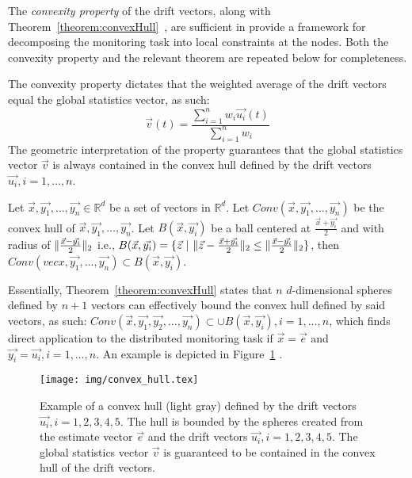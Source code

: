 The \emph{convexity property} of the drift vectors, along with Theorem~\ref{theorem:convexHull}~\cite{Sharfman2006GM}, are sufficient in provide a framework for decomposing the monitoring task into local constraints at the nodes. Both the convexity property and the relevant theorem are repeated below for completeness.
	
The convexity property dictates that the weighted average of the drift vectors equal the global statistics vector, as such:
\begin{equation}
\vec{v}(t)=\frac{\sum_{i=1}^n {w_i\vec{u_i}(t)}}{\sum_{i=1}^n {w_i}}
\label{form:convexityProperty}
\end{equation}
The geometric interpretation of the property guarantees that the global statistics vector $\vec{v}$ is always contained in the convex hull defined by the drift vectors $\vec{u_i}, i=1,\dots,n$.


\begin{theorem}\label{theorem:convexHull}
Let $\vec{x}, \vec{y_1}, \dots, \vec{y_n} \in \mathbb{R}^d$ be a set of vectors in $\mathbb{R}^d$. Let $Conv(\vec{x}, \vec{y_1}, \dots, \vec{y_n})$ be the convex hull of $\vec{x}, \vec{y_1}, \dots, \vec{y_n}$. Let $B(\vec{x}, \vec{y_i})$ be a ball centered at $\frac{\vec{x}+\vec{y_i}}{2}$ and with radius of $\lVert\frac{\vec{x}-\vec{y_i}}{2}\rVert_2$ i.e., $B(\vec{x}, \vec{y_i})=\{\vec{z}\ |\ \norm{\vec{z}-\frac{\vec{x}+\vec{y_i}}{2}}_2 \leq \norm{\frac{\vec{x}-\vec{y_i}}{2}}_2 \}$, then $Conv(vec{x}, \vec{y_1}, \dots, \vec{y_n}) \subset B(\vec{x}, \vec{y_i})$.
\end{theorem}

Essentially, Theorem~\ref{theorem:convexHull} states that $n$ $d$-dimensional spheres defined by $n+1$ vectors can effectively bound the convex hull defined by said vectors, as such: $Conv(\vec{x}, \vec{y_1}, \vec{y_2}, \dots, \vec{y_n}) \subset  \cup B(\vec{x}, \vec{y_i}), i=1,\dots,n$, which finds direct application to the distributed monitoring task if $\vec{x}=\vec{e}$ and $\vec{y_i}=\vec{u_i}, i=1,\dots,n$. An example is depicted in Figure~\ref{fig:convexHull}
.


\begin{figure}[H]
\centering
\texttt{[image: img/convex\_hull.tex]}
\caption{Example of a convex hull (light gray) defined by the drift vectors $\vec{u_i}, i=1,2,3,4,5$. The hull is bounded by the spheres created from the estimate vector $\vec{e}$ and the drift vectors $\vec{u_i}, i=1,2,3,4,5$. The global statistics vector $\vec{v}$ is guaranteed to be contained in the convex hull of the drift vectors.} 
\label{fig:convexHull}
\end{figure}

